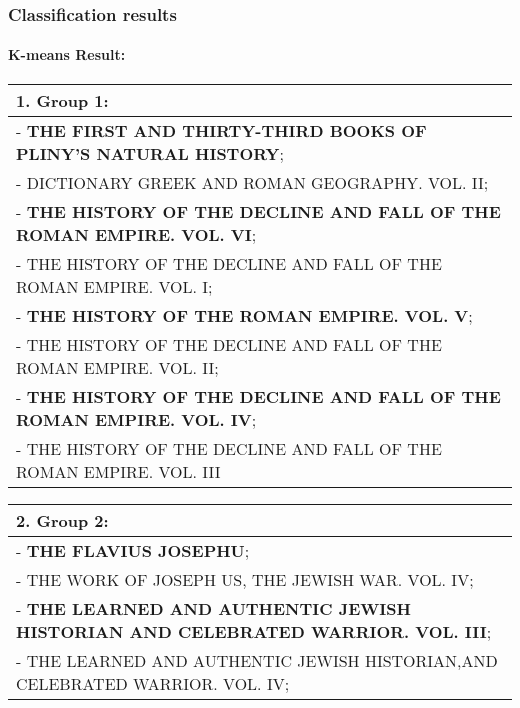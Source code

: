 \documentclass[11pt]{article}
\begin{document}
    \hypertarget{classification-results}{%
\subsubsection{Classification results}\label{classification-results}}

\hypertarget{k-means-result}{%
\paragraph{K-means Result:}\label{k-means-result}}

\begin{longtable}[]{@{}l@{}}
\toprule
1. Group 1:\tabularnewline
\midrule
\endhead
- \textbf{THE FIRST AND THIRTY-THIRD BOOKS OF PLINY'S NATURAL
HISTORY};\tabularnewline
- DICTIONARY GREEK AND ROMAN GEOGRAPHY. VOL. II;\tabularnewline
- \textbf{THE HISTORY OF THE DECLINE AND FALL OF THE ROMAN EMPIRE. VOL.
VI};\tabularnewline
- THE HISTORY OF THE DECLINE AND FALL OF THE ROMAN EMPIRE. VOL.
I;\tabularnewline
- \textbf{THE HISTORY OF THE ROMAN EMPIRE. VOL. V};\tabularnewline
- THE HISTORY OF THE DECLINE AND FALL OF THE ROMAN EMPIRE. VOL.
II;\tabularnewline
- \textbf{THE HISTORY OF THE DECLINE AND FALL OF THE ROMAN EMPIRE. VOL.
IV};\tabularnewline
- THE HISTORY OF THE DECLINE AND FALL OF THE ROMAN EMPIRE. VOL.
III\tabularnewline
\bottomrule
\end{longtable}

\begin{longtable}[]{@{}l@{}}
\toprule
\begin{minipage}[b]{0.97\columnwidth}\raggedright
2. Group 2:\strut
\end{minipage}\tabularnewline
\midrule
\endhead
\begin{minipage}[t]{0.97\columnwidth}\raggedright
- \textbf{THE FLAVIUS JOSEPHU};\strut
\end{minipage}\tabularnewline
\begin{minipage}[t]{0.97\columnwidth}\raggedright
- THE WORK OF JOSEPH US, THE JEWISH WAR. VOL. IV;\strut
\end{minipage}\tabularnewline
\begin{minipage}[t]{0.97\columnwidth}\raggedright
- \textbf{THE LEARNED AND AUTHENTIC JEWISH HISTORIAN AND CELEBRATED
WARRIOR. VOL. III};\strut
\end{minipage}\tabularnewline
\begin{minipage}[t]{0.97\columnwidth}\raggedright
- THE LEARNED AND AUTHENTIC JEWISH HISTORIAN,AND CELEBRATED WARRIOR.
VOL. IV;\strut
\end{minipage}\tabularnewline
\bottomrule
\end{longtable}
\end{document}
